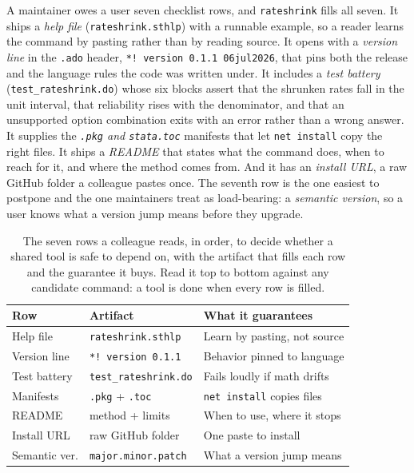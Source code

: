 \documentclass[
    a4paper,
    fontsize=10pt,
    twoside=true,
    numbers=noenddot,
]{kaobook}
\begin{document}
A maintainer owes a user seven checklist rows, and \texttt{rateshrink} fills all seven. It ships a \emph{help file} (\texttt{rateshrink.sthlp}) with a runnable example, so a reader learns the command by pasting rather than by reading source. It opens with a \emph{version line} in the \texttt{.ado} header, \texttt{*! version 0.1.1  06jul2026}, that pins both the release and the language rules the code was written under. It includes a \emph{test battery} (\texttt{test\_rateshrink.do}) whose six blocks assert that the shrunken rates fall in the unit interval, that reliability rises with the denominator, and that an unsupported option combination exits with an error rather than a wrong answer. It supplies the \emph{\texttt{.pkg} and \texttt{stata.toc}} manifests that let \texttt{net install} copy the right files. It ships a \emph{README} that states what the command does, when to reach for it, and where the method comes from. And it has an \emph{install URL}, a raw GitHub folder a colleague pastes once. The seventh row is the one easiest to postpone and the one maintainers treat as load-bearing: a \emph{semantic version}, so a user knows what a version jump means before they upgrade.

\begin{table}[htbp]
\centering
\caption[The seven-row tool-hardening checklist]{The seven rows a colleague reads, in order, to decide whether a shared tool is safe to depend on, with the artifact that fills each row and the guarantee it buys. Read it top to bottom against any candidate command: a tool is done when every row is filled.}
\label{tab:ch15-viz-checklist}
\begin{tabular}{lll}
\hline
Row & Artifact & What it guarantees \\
\hline
Help file     & \texttt{rateshrink.sthlp}     & Learn by pasting, not source \\
Version line  & \texttt{*! version 0.1.1}     & Behavior pinned to language \\
Test battery  & \texttt{test\_rateshrink.do}  & Fails loudly if math drifts \\
Manifests     & \texttt{.pkg} + \texttt{.toc} & \texttt{net install} copies files \\
README        & method + limits              & When to use, where it stops \\
Install URL   & raw GitHub folder            & One paste to install \\
Semantic ver. & \texttt{major.minor.patch}    & What a version jump means \\
\hline
\end{tabular}
\end{table}
\end{document}
